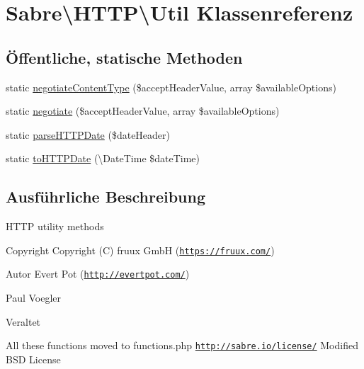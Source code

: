 \hypertarget{class_sabre_1_1_h_t_t_p_1_1_util}{}\section{Sabre\textbackslash{}H\+T\+TP\textbackslash{}Util Klassenreferenz}
\label{class_sabre_1_1_h_t_t_p_1_1_util}
\subsection*{Öffentliche, statische Methoden}
\begin{DoxyCompactItemize}
\item 
static \mbox{\hyperlink{class_sabre_1_1_h_t_t_p_1_1_util_a84017f44dd698a9cbcab00dd9dff2fa6}{negotiate\+Content\+Type}} (\$accept\+Header\+Value, array \$available\+Options)
\item 
static \mbox{\hyperlink{class_sabre_1_1_h_t_t_p_1_1_util_a45eded309d00db4d7e93464446d43a22}{negotiate}} (\$accept\+Header\+Value, array \$available\+Options)
\item 
static \mbox{\hyperlink{class_sabre_1_1_h_t_t_p_1_1_util_a7f83550cc060ab44c47f302ea4cebb30}{parse\+H\+T\+T\+P\+Date}} (\$date\+Header)
\item 
static \mbox{\hyperlink{class_sabre_1_1_h_t_t_p_1_1_util_af5a70c07fd3dab23788af555aa107b78}{to\+H\+T\+T\+P\+Date}} (\textbackslash{}Date\+Time \$date\+Time)
\end{DoxyCompactItemize}


\subsection{Ausführliche Beschreibung}
H\+T\+TP utility methods

\begin{DoxyCopyright}{Copyright}
Copyright (C) fruux GmbH (\href{https://fruux.com/}{\tt https\+://fruux.\+com/}) 
\end{DoxyCopyright}
\begin{DoxyAuthor}{Autor}
Evert Pot (\href{http://evertpot.com/}{\tt http\+://evertpot.\+com/}) 

Paul Voegler 
\end{DoxyAuthor}
\begin{DoxyRefDesc}{Veraltet}
\item[\mbox{\hyperlink{deprecated__deprecated000056}{Veraltet}}]All these functions moved to functions.\+php  \href{http://sabre.io/license/}{\tt http\+://sabre.\+io/license/} Modified B\+SD License \end{DoxyRefDesc}


